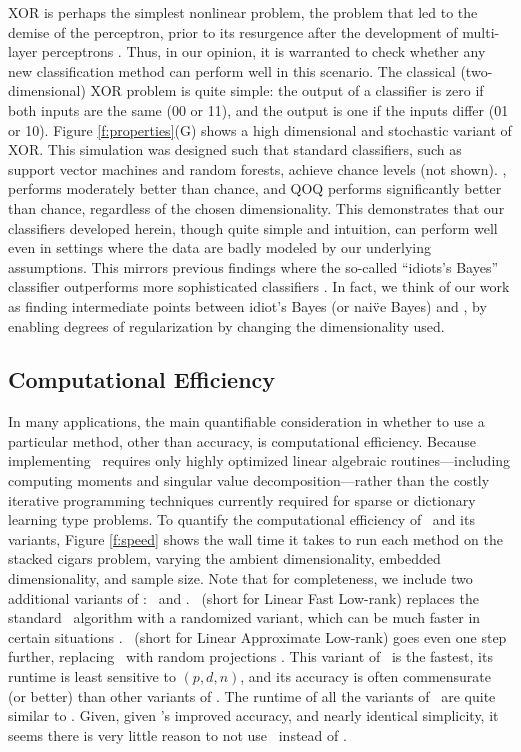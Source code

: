 \documentclass[10pt]{article}
\begin{document}
  XOR is perhaps the simplest nonlinear problem, the problem that led to the demise of the perceptron, prior to its resurgence after the development of multi-layer perceptrons \cite{Bishop2006a}.  Thus, in our opinion, it is warranted to check whether any new classification method can perform well in this scenario.  The classical (two-dimensional) XOR problem is quite simple: the output of a classifier is zero if both inputs are the same (00 or 11), and the output is one if the inputs differ (01 or 10).  Figure \ref{f:properties}(G) shows a high dimensional and stochastic variant of XOR.  This simulation was designed such that standard classifiers, such as support vector machines and random forests, achieve chance levels (not shown).  \Lol, performs moderately better than chance, and QOQ performs significantly better than chance, regardless of the chosen dimensionality.  This demonstrates that our classifiers developed herein, though quite simple and intuition, can perform well even in settings where the data are badly modeled by our underlying assumptions.  This mirrors previous findings where the so-called ``idiots's Bayes'' classifier outperforms more sophisticated classifiers \cite{Bickel2004a}.  In fact, we think of our work as finding intermediate points between idiot's Bayes (or nai\"ve Bayes) and \Fld, by enabling degrees of regularization by changing the dimensionality used.


\subsection*{Computational Efficiency}

In many applications, the main quantifiable consideration in whether to use a particular method, other than accuracy, is computational efficiency.  Because implementing \Lol~requires only highly optimized linear algebraic routines---including computing moments and singular value decomposition---rather than the costly iterative programming techniques currently required for sparse or dictionary learning type problems.  To quantify the computational efficiency of \Lol~and its variants, Figure \ref{f:speed} shows the wall time it takes to run each method on the stacked cigars problem, varying the ambient dimensionality, embedded dimensionality, and sample size.  Note that for completeness, we include two additional variants of \Lol: \Lal~and \Lfl.  \Lfl~(short for Linear Fast Low-rank) replaces the standard \Svd~algorithm with a randomized variant, which can be much faster in certain situations \cite{Halko2011a}.  \Lal~(short for Linear Approximate Low-rank) goes even one step further, replacing \Svd~with random projections \cite{Candes2006a}.  This variant of \Lol~is the fastest, its runtime is  least sensitive to $(p,d,n)$, and its accuracy is often commensurate (or better) than other variants of \Lol.  The runtime of all the variants of \Lol~are quite similar to .  Given, given \Lol's improved accuracy, and nearly identical simplicity, it seems there is very little reason to not use \Lol~instead of .
\end{document}
